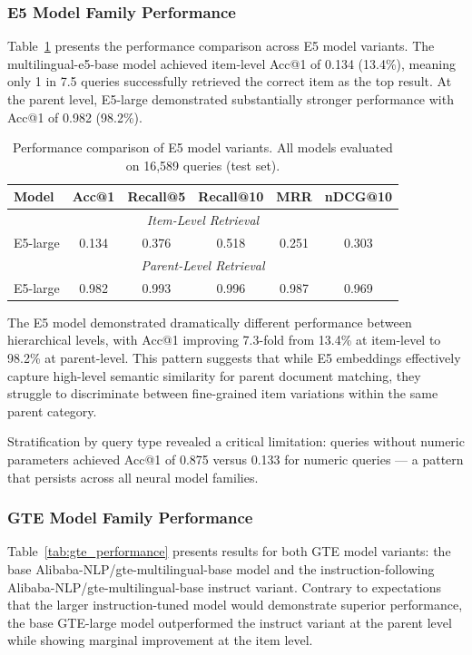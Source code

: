 \documentclass[preprint,12pt]{elsarticle}
\begin{document}
\subsubsection{E5 Model Family Performance}

Table~\ref{tab:e5_performance} presents the performance comparison across E5 model variants. The multilingual-e5-base model achieved item-level Acc@1 of 0.134 (13.4\%), meaning only 1 in 7.5 queries successfully retrieved the correct item as the top result. At the parent level, E5-large demonstrated substantially stronger performance with Acc@1 of 0.982 (98.2\%).

\begin{table}[htbp]
\centering
\caption{Performance comparison of E5 model variants. All models evaluated on 16,589 queries (test set).}
\label{tab:e5_performance}
\begin{tabular}{lccccc}
\hline
\textbf{Model} & \textbf{Acc@1} & \textbf{Recall@5} & \textbf{Recall@10} & \textbf{MRR} & \textbf{nDCG@10} \\
\hline
\multicolumn{6}{c}{\textit{Item-Level Retrieval}} \\
\hline
E5-large & 0.134 & 0.376 & 0.518 & 0.251 & 0.303 \\
\hline
\multicolumn{6}{c}{\textit{Parent-Level Retrieval}} \\
\hline
E5-large & 0.982 & 0.993 & 0.996 & 0.987 & 0.969 \\
\hline
\end{tabular}
\end{table}

The E5 model demonstrated dramatically different performance between hierarchical levels, with Acc@1 improving 7.3-fold from 13.4\% at item-level to 98.2\% at parent-level. This pattern suggests that while E5 embeddings effectively capture high-level semantic similarity for parent document matching, they struggle to discriminate between fine-grained item variations within the same parent category.

Stratification by query type revealed a critical limitation: queries without numeric parameters achieved Acc@1 of 0.875 versus 0.133 for numeric queries --- a pattern that persists across all neural model families.

\subsubsection{GTE Model Family Performance}

Table~\ref{tab:gte_performance} presents results for both GTE model variants: the base Alibaba-NLP/gte-multilingual-base model and the instruction-following Alibaba-NLP/gte-multilingual-base instruct variant. Contrary to expectations that the larger instruction-tuned model would demonstrate superior performance, the base GTE-large model outperformed the instruct variant at the parent level while showing marginal improvement at the item level.
\end{document}
